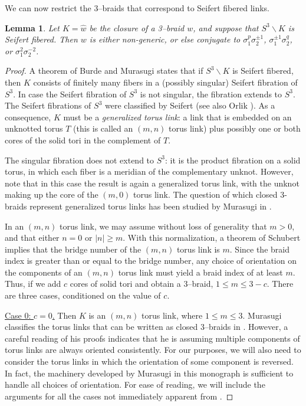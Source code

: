 \documentclass[11pt]{amsart}
\renewcommand{\setminus}{{\smallsetminus}}
\newcommand{\abs}[1]{{\left\vert #1 \right\vert}}
\theoremstyle{plain}
\newtheorem{lemma}[theorem]{Lemma}
\theoremstyle{definition}
\begin{document}
We can now restrict the $3$--braids that correspond to Seifert fibered links.

\begin{lemma}\label{lemma:seifert-braids}
Let $K = \hat{w}$ be the closure of a 3--braid $w$, and suppose that
$S^3 \setminus K$ is Seifert fibered. Then $w$ is either non-generic,
or else conjugate to $\sigma_1^p \sigma_2^{\pm 1}$, $\sigma_1^{\pm 1}
\sigma_2^{q}$, or $\sigma_1^{2} \sigma_2^{-2}$.
\end{lemma}

\begin{proof}
A theorem of Burde and Murasugi \cite{burde-murasugi} states that if
$S^3 \setminus K$ is Seifert fibered, then $K$ consists of finitely
many fibers in a (possibly singular) Seifert fibration of $S^3$.  In
case the Seifert fibration of $S^3$ is not singular, the fibration
extends to $S^3$.  The Seifert fibrations of $S^3$ were classified by
Seifert \cite{seifert:fibering} (see also Orlik
\cite{orlik:seifert-manifolds}).  As a consequence, $K$ must be a
\emph{generalized torus link}: a link that is embedded on an unknotted
torus $T$ (this is called an $(m,n)$ torus link) plus possibly one or
both cores of the solid tori in the complement of $T$.

The singular fibration does not extend to $S^3$: it is the product
fibration on a solid torus, in which each fiber is a meridian of the
complementary unknot.  However, note that in this case the result is
again a generalized torus link, with the unknot making up the core of
the $(m, 0)$ torus link.
%
The question of which closed 3-braids represent generalized torus
links has been studied by Murasugi in \cite{murasugi:3braids}.



In an $(m,n)$ torus link, we may assume without loss of generality
that $m>0$, and that either $n=0$ or $\abs{n} \geq m$.  With this
normalization, a theorem of Schubert \cite{schubert:braids} implies
that the bridge number of the $(m,n)$ torus link is $m$. Since the
braid index is greater than or equal to the bridge number, any choice
of orientation on the components of an $(m,n)$ torus link must yield a
braid index of at least $m$.
%
Thus, if we add $c$ cores of solid tori and obtain a $3$--braid, $1
\leq m \leq 3-c$.  There are three cases, conditioned on the value of
$c$.

\smallskip
\underline{Case 0: $c=0$.}  Then $K$ is an $(m, n)$ torus link, where
$1 \leq m \leq 3$.
Murasugi classifies the torus links that can be written as closed
3--braids in \cite[Section 12]{murasugi:3braids}.  However, a careful
reading of his proofs indicates that he is assuming multiple
components of torus links are always oriented consistently.
For our purposes, we will also need to consider the torus links in 
which the orientation of some component is reversed.
In fact, the machinery developed by Murasugi in this monograph
is sufficient to handle all choices of orientation.  For ease of reading, we will include the
arguments for all the cases not immediately apparent from
\cite{murasugi:3braids}.


\end{proof}
\end{document}
